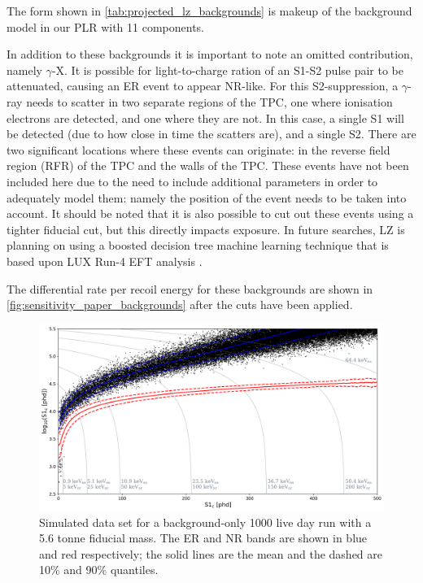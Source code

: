 The form shown in \autoref{tab:projected_lz_backgrounds} is makeup of the background model in our PLR with 11 components.
\par
In addition to these backgrounds it is important to note an omitted contribution, namely $\gamma$-X.
It is possible for light-to-charge ration of an S1-S2 pulse pair to be attenuated, causing an ER event to appear NR-like.
For this S2-suppression, a $\gamma$-ray needs to scatter in two separate regions of the TPC, one where ionisation electrons are detected, and one where they are not.
In this case, a single S1 will be detected (due to how close in time the scatters are), and a single S2.
There are two significant locations where these events can originate: in the reverse field region (RFR) of the TPC and the walls of the TPC.
These events have not been included here due to the need to include additional parameters in order to adequately model them: namely the position of the event needs to be taken into account.
It should be noted that it is also possible to cut out these events using a tighter fiducial cut, but this directly impacts exposure.
In future searches, LZ is planning on using a boosted decision tree machine learning technique that is based upon LUX Run-4 EFT analysis \cite{LUX_RUN4_EFT_2021}.
\par
The differential rate per recoil energy for these backgrounds are shown in \autoref{fig:sensitivity_paper_backgrounds} after the cuts have been applied.


\begin{figure}
    \centering
    \includegraphics[width=15cm]{Figures/EFT/Projected_backgrounds/projected_backgrounds_s1_s2.png}
    \caption{Simulated data set for a background-only 1000 live day run with a 5.6 tonne fiducial mass. The ER and NR bands are shown in blue and red respectively; the solid lines are the mean and the dashed are 10\% and 90\% quantiles.}
    \label{fig:my_label}
\end{figure}







